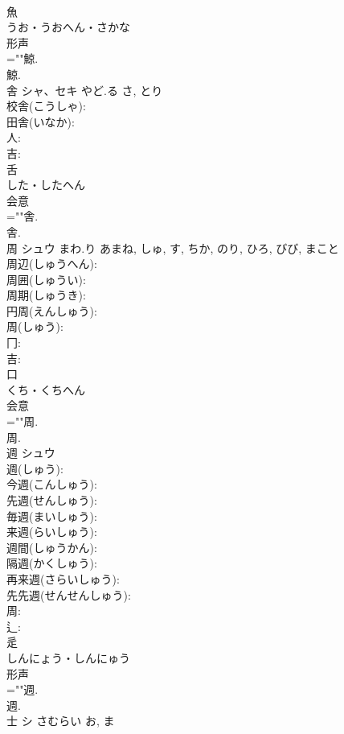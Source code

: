 \documentclass[8pt]{extreport}
\begin{document}
\begin{CJK}{UTF8}{min}
\\	魚	
\\	うお・うおへん・さかな	
\\	形声 
\\	=""鯨.
\\	鯨.
\\	舎	シャ、セキ	やど.る	さ, とり	
\\	校舎(こうしゃ): 
\\	田舎(いなか): 
\\	人: 
\\	吉: 
\\	舌	
\\	した・したへん	
\\	会意 
\\	=""舎.
\\	舎.
\\	周	シュウ	まわ.り	あまね, しゅ, す, ちか, のり, ひろ, びび, まこと	
\\	周辺(しゅうへん): 
\\	周囲(しゅうい): 
\\	周期(しゅうき): 
\\	円周(えんしゅう): 
\\	周(しゅう): 
\\	冂: 
\\	吉: 
\\	口	
\\	くち・くちへん	
\\	会意 
\\	=""周.
\\	周.
\\	週	シュウ			
\\	週(しゅう): 
\\	今週(こんしゅう): 
\\	先週(せんしゅう): 
\\	毎週(まいしゅう): 
\\	来週(らいしゅう): 
\\	週間(しゅうかん): 
\\	隔週(かくしゅう): 
\\	再来週(さらいしゅう): 
\\	先先週(せんせんしゅう): 
\\	周: 
\\	辶: 
\\	辵	
\\	しんにょう・しんにゅう	
\\	形声 
\\	=""週.
\\	週.
\\	士	シ	さむらい	お, ま	

\end{CJK}
\end{document}
